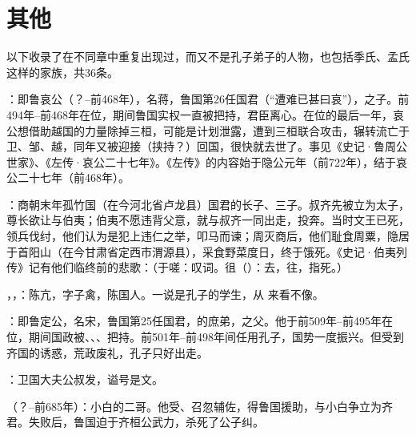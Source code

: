\lypdfbookmark\section*{其他}

以下收录了在不同章中重复出现过，而又不是孔子弟子的人物，也包括季氏、孟氏这样的家族，共36条。

\bigskip

：即鲁哀公（？--前468年），名蒋，鲁国第26任国君（“遭难已甚曰哀”），之子。前494年--前468年在位，期间鲁国实权一直被把持，君臣离心。在位的最后一年，哀公想借助越国的力量除掉三桓，可能是计划泄露，遭到三桓联合攻击，辗转流亡于卫、邹、越，同年又被迎接（挟持？）回国，很快就去世了。事见《史记·鲁周公世家》、《左传·哀公二十七年》。《左传》的内容始于隐公元年（前722年），结于哀公二十七年（前468年）。%

：商朝末年孤竹国（在今河北省卢龙县）国君的长子、三子。叔齐先被立为太子，尊长欲让与伯夷；伯夷不愿违背父意，就与叔齐一同出走，投奔。当时文王已死，领兵伐纣，他们认为是犯上违仁之举，叩马而谏；周灭商后，他们耻食周粟，隐居于首阳山（在今甘肃省定西市渭源县），采食野菜度日，终于饿死。《史记·伯夷列传》记有他们临终前的悲歌：（于嗟：叹词。徂（）：去，往，指死。）

，，：陈亢，字子禽，陈国人。一说是孔子的学生，从  来看不像。

：即鲁定公，名宋，鲁国第25任国君，的庶弟，之父。他于前509年--前495年在位，期间国政被、、、把持。前501年--前498年间任用孔子，国势一度振兴。但受到齐国的诱惑，荒政废礼，孔子只好出走。

：卫国大夫公叔发，谥号是文。

（？--前685年）：小白的二哥。他受、召忽辅佐，得鲁国援助，与小白争立为齐君。失败后，鲁国迫于齐桓公武力，杀死了公子纠。

